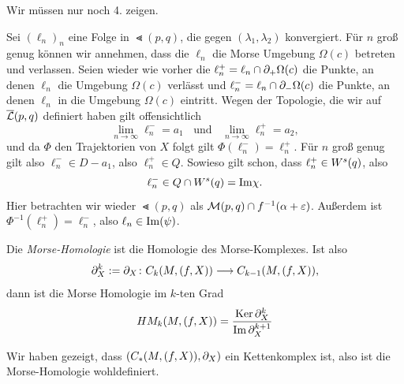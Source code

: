 \begin{bigproof}
    Wir müssen nur noch 4. zeigen.

    Sei $(\ell_n)_n$ eine Folge in $\Lt (p, q)$, die gegen $(\lambda_1, \lambda_2)$ konvergiert. 
    Für $n$ groß genug können wir annehmen, dass die $\ell_n$ die Morse Umgebung $\Omega (c)$ betreten 
    und verlassen. Seien wieder wie vorher die $\ell_n^+ = \ell_n \cap { \partial }_+ \Omega (c)$ die Punkte, 
    an denen $\ell_n$ die Umgebung $\Omega (c)$ verlässt und $\ell_n^- = \ell_n \cap { \partial }_- \Omega (c)$
    die Punkte, an denen $\ell_n$ in die Umgebung $\Omega (c)$ eintritt. Wegen der Topologie, die wir 
    auf ${\overline{\mathcal{L}} }(p, q)$ definiert haben gilt offensichtlich
    \[ \lim_{n \to \infty} \ell_n^- = a_1 \; \; \text{ und } \; \; \lim_{n \to \infty} \ell_n^+ = a_2 , \]
    und da $\Phi$ den Trajektorien von $X$ folgt gilt $\Phi(\ell_n^-) = \ell_n^+$.
    Für $n$ groß genug gilt also $\ell_n^- \in D - a_1$, also $\ell_n^+ \in Q$. Sowieso gilt schon, dass
    $\ell_n^+ \in { W^s } (q)$, also 
    \[ \ell_n^- \in Q \cap { W^s } (q) = { \operatorname{Im} } \chi . \]
    Hier betrachten wir wieder $\Lt (p, q)$ als $\mathcal{M} (p, q) \cap f^{-1} (\alpha + \varepsilon)$.
    Außerdem ist $\Phi^{-1}(\ell_n^+) = \ell_n^-$, also $\ell_n \in { \operatorname{Im} } (\psi)$.
\end{bigproof}

\begin{definition}
    \label{def: morse-homologie}
    Die \textit{Morse-Homologie} ist die Homologie des Morse-Komplexes. Ist also
    \[ { \partial }_X^k := { \partial }_X \colon C_k (M, (f, X)) \longrightarrow C_{k - 1} (M, (f, X)), \]
    dann ist die Morse Homologie im $k$-ten Grad 
    \[ HM_k (M, (f, X)) = \frac{{ \operatorname{Ker} } \, { \partial }_X^k}{{ \operatorname{Im} } \, { \partial }_X^{k + 1}} \]
\end{definition}

Wir haben gezeigt, dass $(C_{\ast}(M, (f, X)), { \partial }_X)$ ein Kettenkomplex ist, also ist die 
Morse-Homologie wohldefiniert.

